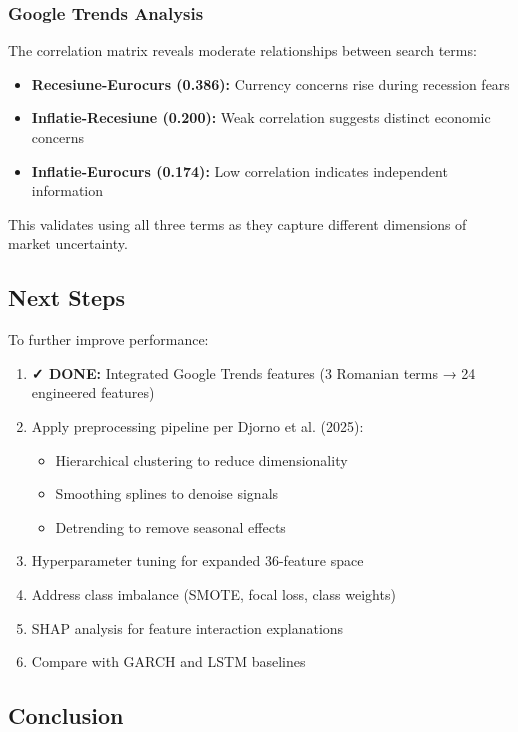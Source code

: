 \documentclass[12pt,a4paper]{article}
\begin{document}
\subsubsection{Google Trends Analysis}

The correlation matrix reveals moderate relationships between search terms:
\begin{itemize}
    \item \textbf{Recesiune-Eurocurs (0.386):} Currency concerns rise during recession fears
    \item \textbf{Inflatie-Recesiune (0.200):} Weak correlation suggests distinct economic concerns
    \item \textbf{Inflatie-Eurocurs (0.174):} Low correlation indicates independent information
\end{itemize}

This validates using all three terms as they capture different dimensions of market uncertainty.

\subsection{Next Steps}

To further improve performance:
\begin{enumerate}
    \item \textbf{✓ DONE:} Integrated Google Trends features (3 Romanian terms → 24 engineered features)
    \item Apply preprocessing pipeline per Djorno et al. (2025):
    \begin{itemize}
        \item Hierarchical clustering to reduce dimensionality
        \item Smoothing splines to denoise signals
        \item Detrending to remove seasonal effects
    \end{itemize}
    \item Hyperparameter tuning for expanded 36-feature space
    \item Address class imbalance (SMOTE, focal loss, class weights)
    \item SHAP analysis for feature interaction explanations
    \item Compare with GARCH and LSTM baselines
\end{enumerate}

\subsection{Conclusion}
\end{document}
